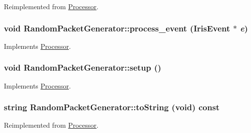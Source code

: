 Reimplemented from \hyperlink{classProcessor_22e869ee49d974ad0ee7ee81961ab88f}{Processor}.\hypertarget{classRandomPacketGenerator_127a1f17b384e0418f055b0c22eb925a}{
\subsubsection[{process\_\-event}]{\setlength{\rightskip}{0pt plus 5cm}void RandomPacketGenerator::process\_\-event ({\bf IrisEvent} $\ast$ {\em e})}}
\label{classRandomPacketGenerator_127a1f17b384e0418f055b0c22eb925a}




Implements \hyperlink{classProcessor_18cdeefafbd8225cb3ad18dd098c0e08}{Processor}.\hypertarget{classRandomPacketGenerator_56eccc2d487bfed691a85afbd0c5b06d}{
\subsubsection[{setup}]{\setlength{\rightskip}{0pt plus 5cm}void RandomPacketGenerator::setup ()}}
\label{classRandomPacketGenerator_56eccc2d487bfed691a85afbd0c5b06d}




Implements \hyperlink{classProcessor_495fad01358e2d9760c526d6e2db53ea}{Processor}.\hypertarget{classRandomPacketGenerator_4031f11000db9e2693c761f7f47a4c88}{
\subsubsection[{toString}]{\setlength{\rightskip}{0pt plus 5cm}string RandomPacketGenerator::toString (void) const}}
\label{classRandomPacketGenerator_4031f11000db9e2693c761f7f47a4c88}




Reimplemented from \hyperlink{classProcessor_d3bdbedfbb00b05f61504e411a418106}{Processor}.

